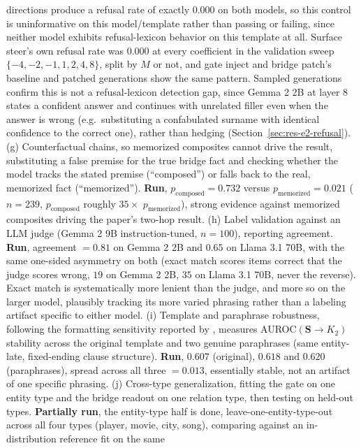 \documentclass{article}
\newcommand{\gate}{\mathbf{S}}
\begin{document}
directions produce a refusal rate of exactly $0.000$ on both models, so this control is uninformative
on this model/template rather than passing or failing, since neither model exhibits refusal-lexicon
behavior on this template at all. Surface steer's own refusal rate was $0.000$ at every coefficient in
the validation sweep $\{-4,-2,-1,1,2,4,8\}$, split by $M$ or not, and gate inject and bridge patch's
baseline and patched generations show the same pattern. Sampled generations confirm this is not a
refusal-lexicon detection gap, since Gemma 2 2B at layer 8 states a confident answer and continues
with unrelated filler even when the answer is wrong (e.g.\ substituting a confabulated surname with
identical confidence to the correct one), rather than hedging (Section~\ref{sec:res-e2-refusal}).
(g) Counterfactual chains, so memorized composites cannot drive the result, substituting a false
premise for the true bridge fact and checking whether the model tracks the stated premise
(``composed'') or falls back to the real, memorized fact (``memorized''). \textbf{Run},
$p_{\mathrm{composed}}=0.732$ versus $p_{\mathrm{memorized}}=0.021$ ($n=239$, $p_{\mathrm{composed}}$
roughly $35\times$ $p_{\mathrm{memorized}}$), strong evidence against memorized composites driving
the paper's two-hop result. (h) Label validation against an {LLM} judge (Gemma 2 9B
instruction-tuned, $n=100$), reporting agreement. \textbf{Run}, agreement $=0.81$ on Gemma 2 2B and
$0.65$ on Llama 3.1 70B, with the same one-sided asymmetry on both (exact match scores items correct
that the judge scores wrong, $19$ on Gemma 2 2B, $35$ on Llama 3.1 70B, never the reverse). Exact
match is systematically more lenient than the judge, and more so on the larger model, plausibly
tracking its more varied phrasing rather than a labeling artifact specific to either model. (i)
Template and paraphrase robustness, following the
formatting sensitivity reported by \citet{tamoyan2025factual}, measures AUROC$(\gate\!\to\!K_2)$
stability across the original template and two genuine paraphrases (same entity-late, fixed-ending
clause structure). \textbf{Run}, $0.607$ (original), $0.618$ and $0.620$ (paraphrases), spread across
all three $=0.013$, essentially stable, not an artifact of one specific phrasing. (j) Cross-type
generalization, fitting the
gate on one entity type and the bridge readout on one relation type, then testing on held-out types.
\textbf{Partially run}, the entity-type half is done, leave-one-entity-type-out across all four
types (player, movie, city, song), comparing against an in-distribution reference fit on the same
\end{document}
